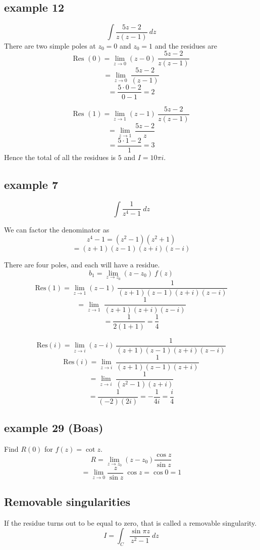 \documentclass[11pt, oneside]{article}
\begin{document}
\subsection*{example 12}

\label{sec:ex12R}

\[ \int \frac{5z-2}{z(z-1)} \ dz \]
There are two simple poles at $z_0 = 0$ and $z_0 = 1$ and the residues are
\[ \text{Res }(0) = \lim_{z \rightarrow 0} (z - 0) \ \frac{5z-2}{z(z-1)} \]
\[ = \lim_{z \rightarrow 0} \ \frac{5z-2}{(z-1)} \]
\[ = \frac{5 \cdot 0 - 2}{0 - 1} = 2 \]

\[ \text{Res }(1) = \lim_{z \rightarrow 1} (z - 1) \ \frac{5z-2}{z(z-1)} \]
\[ = \lim_{z \rightarrow 1} \ \frac{5z-2}{z} \]
\[ = \frac{5 \cdot 1 - 2}{1} = 3 \]
Hence the total of all the residues is $5$ and $I = 10 \pi i$.

\subsection*{example 7}

\label{sec:ex7R}

\[ \int \frac{1}{z^4 - 1} \ dz \]

We can factor the denominator as
\[ z^4 - 1 = (z^2 - 1)(z^2 + 1) \]
\[ = (z+1)(z-1)(z+i)(z-i) \]

There are four poles, and each will have a residue.
\[ b_1 = \lim_{z \rightarrow z_0} (z-z_0) \ f(z)  \]
\[ \text{Res}(1) =  \lim_{z \rightarrow 1} (z-1) \ \frac{1}{(z+1)(z-1)(z+i)(z-i)} \]
\[ =  \lim_{z \rightarrow 1} \ \frac{1}{(z+1)(z+i)(z-i)} \]
\[ = \frac{1}{2(1+1)} = \frac{1}{4} \]

\[ \text{Res}(i) =  \lim_{z \rightarrow i} (z-i) \ \frac{1}{(z+1)(z-1)(z+i)(z-i)} \]
\[ \text{Res}(i) =  \lim_{z \rightarrow i} \ \frac{1}{(z+1)(z-1)(z+i)} \]
\[ =  \lim_{z \rightarrow i} \ \frac{1}{(z^2 - 1)(z+i)} \]
\[ = \frac{1}{(-2)(2i)} = -\frac{1}{4i} = \frac{i}{4}  \]

\subsection*{example 29 (Boas)}

\label{sec:ex29R}

Find $R(0)$ for $f(z) = \cot z$.
\[ R = \lim_{z \rightarrow z_0} (z - z_0) \frac{\cos z}{\sin z} \]
\[ = \lim_{z \rightarrow 0} \frac{z}{\sin z} \ \cos z = \cos 0 = 1 \]

\subsection*{Removable singularities}
If the residue turns out to be equal to zero, that is called a removable singularity.  
\[ I = \int_C \frac{\sin \pi z}{z^2 - 1} \ dz \]
\end{document}
